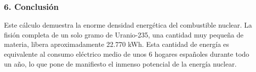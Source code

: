\subsubsection*{6. Conclusión}
\begin{cajaconclusion}
Este cálculo demuestra la enorme densidad energética del combustible nuclear. La fisión completa de un solo gramo de Uranio-235, una cantidad muy pequeña de materia, libera aproximadamente 22.770 kWh. Esta cantidad de energía es equivalente al consumo eléctrico medio de unos 6 hogares españoles durante todo un año, lo que pone de manifiesto el inmenso potencial de la energía nuclear.
\end{cajaconclusion}

\newpage
